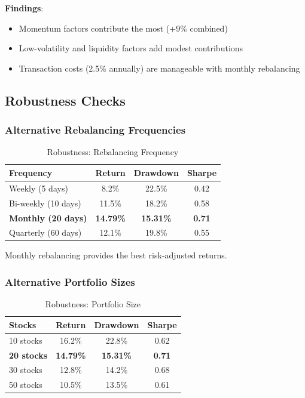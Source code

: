 \textbf{Findings}:
\begin{itemize}
    \item Momentum factors contribute the most (+9\% combined)
    \item Low-volatility and liquidity factors add modest contributions
    \item Transaction costs (2.5\% annually) are manageable with monthly rebalancing
\end{itemize}

\subsection{Robustness Checks}

\subsubsection{Alternative Rebalancing Frequencies}

\begin{table}[h]
\centering
\caption{Robustness: Rebalancing Frequency}
\label{tab:freq}
\begin{tabular}{lccc}
\toprule
Frequency & Return & Drawdown & Sharpe \\
\midrule
Weekly (5 days) & 8.2\% & 22.5\% & 0.42 \\
Bi-weekly (10 days) & 11.5\% & 18.2\% & 0.58 \\
\textbf{Monthly (20 days)} & \textbf{14.79\%} & \textbf{15.31\%} & \textbf{0.71} \\
Quarterly (60 days) & 12.1\% & 19.8\% & 0.55 \\
\bottomrule
\end{tabular}
\end{table}

Monthly rebalancing provides the best risk-adjusted returns.

\subsubsection{Alternative Portfolio Sizes}

\begin{table}[h]
\centering
\caption{Robustness: Portfolio Size}
\label{tab:size}
\begin{tabular}{lccc}
\toprule
Stocks & Return & Drawdown & Sharpe \\
\midrule
10 stocks & 16.2\% & 22.8\% & 0.62 \\
\textbf{20 stocks} & \textbf{14.79\%} & \textbf{15.31\%} & \textbf{0.71} \\
30 stocks & 12.8\% & 14.2\% & 0.68 \\
50 stocks & 10.5\% & 13.5\% & 0.61 \\
\bottomrule
\end{tabular}
\end{table}

